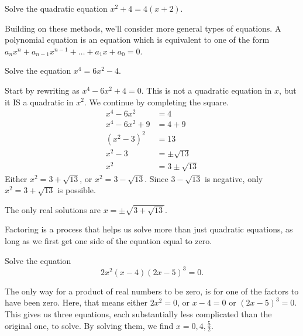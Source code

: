 \documentclass{ximera}
\begin{document}
\begin{problem}
	Solve the quadratic equation $\displaystyle x^2 + 4 = 4\left(x+2\right)$.
	\begin{multipleChoice}
  \end{multipleChoice}
\end{problem}




Building on these methods, we'll consider more general types of equations.
A polynomial equation is an equation which is equivalent to one of the form $a_n x^n + a_{n-1} x^{n-1} + \dots + a_1 x + a_0 = 0$. 
\begin{example}
	Solve the equation $x^4 = 6x^2 - 4$.
	\begin{explanation}
		Start by rewriting as $x^4 - 6x^2 + 4=0$.  This is not a quadratic equation in $x$, but it IS a quadratic in $x^2$.
		We continue by completing the square.
		\begin{align*}
			x^4 - 6x^2 &= 4 \\
			x^4 - 6x^2 + 9 &= 4 + 9\\
			(x^2 - 3)^2 &= 13\\
			x^2 - 3 &= \pm \sqrt{13}\\
			x^2 &= 3 \pm \sqrt{13}
		\end{align*}
		Either $x^2 = 3 + \sqrt{13}$, or $x^2 = 3 - \sqrt{13}$.  Since $3 - \sqrt{13}$ is negative, only $x^2 = 3 + \sqrt{13}$ is possible.
		
		The only real solutions are $x = \pm \sqrt{3 + \sqrt{13}}$.
	\end{explanation}
\end{example}

Factoring is a process that helps us solve more than just quadratic equations, as long as we first get one side of the equation equal to zero.
\begin{example}
	Solve the equation
	\[ 2x^2 \left( x-4 \right) \left( 2x-5\right)^3 = 0. \]
	\begin{explanation}
		The only way for a product of real numbers to be zero, is for one of the factors to have been zero.
		Here, that means either $2x^2 = 0$, or $x-4 = 0$ or $(2x-5)^3 = 0$.
		This gives us three equations, each substantially less complicated than the original one, to solve.  By solving them, we find
		$x = 0, 4, \frac{5}{2}$.
	\end{explanation}
\end{example}
\end{document}
